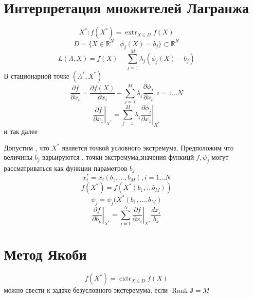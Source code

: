 \documentclass[14pt]{extarticle}
\DeclareMathOperator{\extr}{extr}
\DeclareMathOperator{\rank}{Rank}
\newcommand{\pa}[2]{ \frac{\partial #1}{\partial #2}}
\newcommand{\bm}[1]{ \left.#1\right|}
\begin{document}
  \section{Интерпретация множителей Лагранжа}
  \begin{equation}
  X^{*}: f(X^{*}) = \extr_{X \in D} f(X)
  \end{equation} 
  \begin{equation}
	  D = \{X \in \mathbb{R}^{N} \mid \phi_{j}(X) = b_{j}\} \subset \mathbb{R}^{N}
  \end{equation} 
  \begin{equation}
  L(\Lambda,X) =f(X) - \sum_{j = 1}^{M} \lambda_{j} (\phi_{j}(X) - b_{j})
  \end{equation} 
  В стационарной точке $(\Lambda^{*},X^{*})$
   \begin{equation}
   \pa{f}{x_{i}} = \pa{f(X)}{x_{i}} - \sum_{j =1}^{M}\lambda_{j} \pa{\phi_{j}}{x_{i}} ,i = 1 \dots N
   \end{equation} 
   \begin{equation}
	   \bm{\pa{f}{x_1}}_{X^{*}} = \sum_{j= 1}^{M} \lambda_{j} \bm{\pa{\phi_{j}}{x_{1}}}_{X^{*}}
   \end{equation} 
   и так далее

   Допустим , что $X^{*}$ 
   является точкой условного экстремума. Предположим
   что величины $b_{j}$ варьируются
   , точки экстремума,значения функицй $f,\psi_{j}$ могут рассматриваться как функции параметров
   $b_{j}$
    \begin{equation}
    	x^{*}_{i} =  x_i (b_1,\dots,b_{M}) , i = 1 \dots N
    \end{equation}
    \begin{equation}
    	f(X^{*}) = f(X^{*} (b_1, \dots b_{M}))
    \end{equation}
    \begin{equation}
	    \psi_{j} = \psi_{j}(X^{*} (b_1,\dots,b_{M})
    \end{equation} 
    \begin{equation}
	    \bm{\frac{\partial f}{\partial b_{k}}}_{X^{*}} =
	    \sum_{i=1}^{N} \bm{ \frac{\partial f}{\partial x_i} }_{X^{*}} \frac{dx_{i}}{b_{k}}
    \end{equation} 
    \section{Метод Якоби}
    \begin{equation}
    f(X^{*}) = \extr_{X \in D} f(X)
    \end{equation} 
    можно свести к задаче 
    безусловного экстеремума, если $\rank \mathbf{J} = M$
\end{document}
